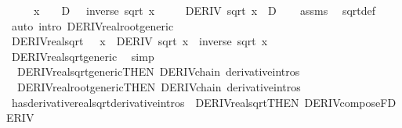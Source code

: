 \begin{isabellebody}
\ \ \ \ \ {\isachardoublequoteopen}x\ {\isacharless}{\kern0pt}\ {}\ {\isasymLongrightarrow}\ D\ {\isacharequal}{\kern0pt}\ {\isacharminus}{\kern0pt}\ inverse\ {\isacharparenleft}{\kern0pt}sqrt\ x{\isacharparenright}{\kern0pt}\ {\isacharslash}{\kern0pt}\ {}{\isachardoublequoteclose}\isanewline
\ \ \ {\isachardoublequoteopen}DERIV\ sqrt\ x\ {\isacharcolon}{\kern0pt}{\isachargreater}{\kern0pt}\ D{\isachardoublequoteclose}\isanewline
%
\isadelimproof
\ \ %
\endisadelimproof
%
\isatagproof
{}\isamarkupfalse%
\ assms\ \isamarkupfalse%
\ sqrt{\isacharunderscore}{\kern0pt}def\isanewline
\ \ \isamarkupfalse%
\ {\isacharparenleft}{\kern0pt}auto\ intro{\isacharbang}{\kern0pt}{\isacharcolon}{\kern0pt}\ DERIV{\isacharunderscore}{\kern0pt}real{\isacharunderscore}{\kern0pt}root{\isacharunderscore}{\kern0pt}generic{\isacharparenright}{\kern0pt}%
\endisatagproof
{\isafoldproof}%
%
\isadelimproof
\isanewline
%
\endisadelimproof
\isanewline
{}\isamarkupfalse%
\ DERIV{\isacharunderscore}{\kern0pt}real{\isacharunderscore}{\kern0pt}sqrt{\isacharcolon}{\kern0pt}\ {\isachardoublequoteopen}{}\ {\isacharless}{\kern0pt}\ x\ {\isasymLongrightarrow}\ DERIV\ sqrt\ x\ {\isacharcolon}{\kern0pt}{\isachargreater}{\kern0pt}\ inverse\ {\isacharparenleft}{\kern0pt}sqrt\ x{\isacharparenright}{\kern0pt}\ {\isacharslash}{\kern0pt}\ {}{\isachardoublequoteclose}\isanewline
%
\isadelimproof
\ \ %
\endisadelimproof
%
\isatagproof
{}\isamarkupfalse%
\ DERIV{\isacharunderscore}{\kern0pt}real{\isacharunderscore}{\kern0pt}sqrt{\isacharunderscore}{\kern0pt}generic\ \isamarkupfalse%
\ simp%
\endisatagproof
{\isafoldproof}%
%
\isadelimproof
\isanewline
%
\endisadelimproof
\isanewline
{}\isamarkupfalse%
\isanewline
\ \ DERIV{\isacharunderscore}{\kern0pt}real{\isacharunderscore}{\kern0pt}sqrt{\isacharunderscore}{\kern0pt}generic{\isacharbrackleft}{\kern0pt}THEN\ DERIV{\isacharunderscore}{\kern0pt}chain{}{\isacharcomma}{\kern0pt}\ derivative{\isacharunderscore}{\kern0pt}intros{\isacharbrackright}{\kern0pt}\isanewline
\ \ DERIV{\isacharunderscore}{\kern0pt}real{\isacharunderscore}{\kern0pt}root{\isacharunderscore}{\kern0pt}generic{\isacharbrackleft}{\kern0pt}THEN\ DERIV{\isacharunderscore}{\kern0pt}chain{}{\isacharcomma}{\kern0pt}\ derivative{\isacharunderscore}{\kern0pt}intros{\isacharbrackright}{\kern0pt}\isanewline
\isanewline
{}\isamarkupfalse%
\ has{\isacharunderscore}{\kern0pt}derivative{\isacharunderscore}{\kern0pt}real{\isacharunderscore}{\kern0pt}sqrt{\isacharbrackleft}{\kern0pt}derivative{\isacharunderscore}{\kern0pt}intros{\isacharbrackright}{\kern0pt}\ {\isacharequal}{\kern0pt}\ DERIV{\isacharunderscore}{\kern0pt}real{\isacharunderscore}{\kern0pt}sqrt{\isacharbrackleft}{\kern0pt}THEN\ DERIV{\isacharunderscore}{\kern0pt}compose{\isacharunderscore}{\kern0pt}FDERIV{\isacharbrackright}{\kern0pt}\isanewline

\end{isabellebody}
